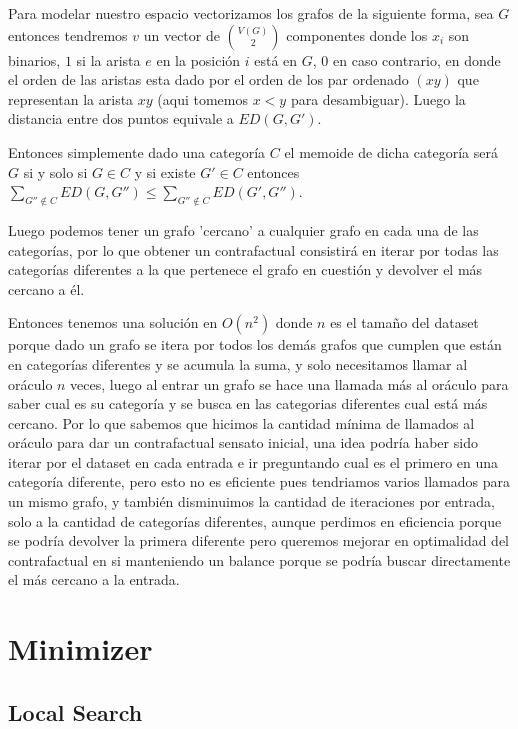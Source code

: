\documentclass[a4paper]{article}
\begin{document}
Para modelar nuestro espacio vectorizamos los grafos de la siguiente forma, sea $G$ entonces tendremos $v$ un vector de $\binom{V(G)}{2}$ componentes donde los $x_i$ son binarios, $1$ si la arista $e$ en la posici\'on $i$ est\'a en $G$, $0$ en caso contrario, en donde el orden de las aristas esta dado por el orden de los par ordenado $(xy)$ que representan la arista $xy$ (aqui tomemos $x<y$ para desambiguar). Luego la distancia entre dos puntos equivale a $ED(G, G')$.

Entonces simplemente dado una categor\'ia $C$ el memoide de dicha categor\'ia ser\'a $G$ si y solo si $G \in C$ y si existe $G' \in C$ entonces $\sum_{G'' \notin C} ED(G, G'') \leq \sum_{G'' \notin C} ED(G', G'')$.

Luego podemos tener un grafo 'cercano' a cualquier grafo en cada una de las categor\'ias, por lo que obtener un contrafactual consistir\'a en iterar por todas las categor\'ias diferentes a la que pertenece el grafo en cuesti\'on y devolver el m\'as cercano a \'el.

Entonces tenemos una soluci\'on en $O(n^2)$ donde $n$ es el tamaño del dataset porque dado un grafo se itera por todos los dem\'as grafos que cumplen que est\'an en categor\'ias diferentes y se acumula la suma, y solo necesitamos llamar al or\'aculo $n$ veces, luego al entrar un grafo se hace una llamada m\'as al or\'aculo para saber cual es su categor\'ia y se busca en las categorias diferentes cual está m\'as cercano. Por lo que sabemos que hicimos la cantidad m\'inima de llamados al or\'aculo para dar un contrafactual sensato inicial, una idea podr\'ia haber sido iterar por el dataset en cada entrada e ir preguntando cual es el primero en una categor\'ia diferente, pero esto no es eficiente pues tendriamos varios llamados para un mismo grafo, y tambi\'en disminuimos la cantidad de iteraciones por entrada, solo a la cantidad de categor\'ias diferentes, aunque perdimos en eficiencia porque se podr\'ia devolver la primera diferente pero queremos mejorar en optimalidad del contrafactual en si manteniendo un balance porque se podr\'ia buscar directamente el m\'as cercano a la entrada.

\section{Minimizer}

\subsection{Local Search}
\end{document}
